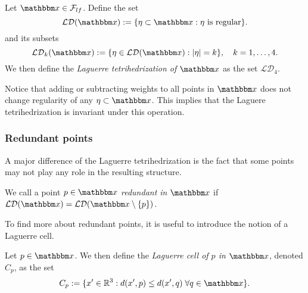 \begin{definition}
	Let $\x \in \mathcal F_{lf}$. Define the set 
	$$\mathcal {LD}(\x) := \{\eta\subset \x: \eta \text{ is regular}\}.$$
	and its subsets
	$$\mathcal {LD}_k(\x) := \{\eta \in \mathcal {LD}(\x): |\eta|=k \},\quad k = 1,\dots,4.$$
	We then define the \textit{Laguerre tetrihedrization of $\x$} as the set $\mathcal {LD}_4$. 
\end{definition}



\begin{remark}
	Notice that adding or subtracting weights to all points in $\x$ does not change regularity of any $\eta \subset \x$. This implies that the Laguere tetrihedrization is invariant under this operation.  
\end{remark}

\begin{remark}
\tbd
\end{remark}

\subsubsection{Redundant points}

A major difference of the Laguerre tetrihedrization is the fact that some points may not play any role in the resulting structure.

\begin{definition}
	We call a point $p \in \x$ \textit{redundant in} $\x$ if $\mathcal {LD}(\x) = \mathcal {LD}(\x \setminus \{p\})$.
\end{definition}

To find more about redundant points, it is useful to introduce the notion of a Laguerre cell.

\begin{definition}
Let $p\in \x$. We then define the \textit{Laguerre cell of $p$ in $\x$}, denoted $C_p$, as the set
$$C_p := \{x' \in \Rt: d(x',p) \leq d(x',q) \; \forall q \in \x\}.$$ 
\end{definition}

